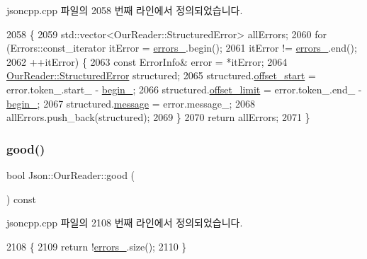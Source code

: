 jsoncpp.\+cpp 파일의 2058 번째 라인에서 정의되었습니다.


\begin{DoxyCode}
2058                                                                          \{
2059   std::vector<OurReader::StructuredError> allErrors;
2060   \textcolor{keywordflow}{for} (Errors::const\_iterator itError = \hyperlink{class_json_1_1_our_reader_afb76b68ba1ab68fe09cf2838e3d4898d}{errors\_}.begin();
2061        itError != \hyperlink{class_json_1_1_our_reader_afb76b68ba1ab68fe09cf2838e3d4898d}{errors\_}.end();
2062        ++itError) \{
2063     \textcolor{keyword}{const} ErrorInfo& error = *itError;
2064     \hyperlink{struct_json_1_1_our_reader_1_1_structured_error}{OurReader::StructuredError} structured;
2065     structured.\hyperlink{struct_json_1_1_our_reader_1_1_structured_error_a102677698afb8177c985e72dafe72b15}{offset\_start} = error.token\_.start\_ - \hyperlink{class_json_1_1_our_reader_a9bda9d72335d52cd06e65f9eca3f70f5}{begin\_};
2066     structured.\hyperlink{struct_json_1_1_our_reader_1_1_structured_error_a15491a751a39c5153af04e68b1d0abb9}{offset\_limit} = error.token\_.end\_ - \hyperlink{class_json_1_1_our_reader_a9bda9d72335d52cd06e65f9eca3f70f5}{begin\_};
2067     structured.\hyperlink{struct_json_1_1_our_reader_1_1_structured_error_a9d0b9986bf765d067dfcf2f971a450d1}{message} = error.message\_;
2068     allErrors.push\_back(structured);
2069   \}
2070   \textcolor{keywordflow}{return} allErrors;
2071 \}
\end{DoxyCode}
\mbox{\label{class_json_1_1_our_reader_a63c7d874fa379397e0a5fa65f0843845}} 
\subsubsection{\texorpdfstring{good()}{good()}}
{\footnotesize\ttfamily bool Json\+::\+Our\+Reader\+::good (\begin{DoxyParamCaption}{ }\end{DoxyParamCaption}) const}



jsoncpp.\+cpp 파일의 2108 번째 라인에서 정의되었습니다.


\begin{DoxyCode}
2108                            \{
2109   \textcolor{keywordflow}{return} !\hyperlink{class_json_1_1_our_reader_afb76b68ba1ab68fe09cf2838e3d4898d}{errors\_}.size();
2110 \}
\end{DoxyCode}
\mbox{\label{class_json_1_1_our_reader_a4a03f1b266def9b47c4fef35386557fb}} 
